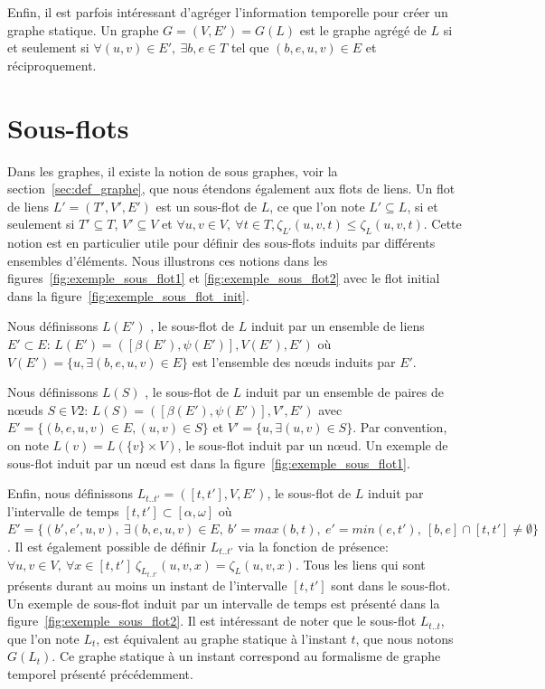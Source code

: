 Enfin, il est parfois intéressant d'agréger l'information temporelle pour créer un graphe statique.
Un graphe $G=(V,E')=G(L)$ est le graphe agrégé de $L$ si et seulement si $\forall (u,v) \in E',\ \exists b,e \in T$ tel que $(b,e,u,v) \in E$ et réciproquement.




\section{Sous-flots}
Dans les graphes, il existe la notion de sous graphes, voir la section~\ref{sec:def_graphe}, que nous étendons également aux flots de liens.
Un flot de liens $L'=(T',V',E')$ est un sous-flot de $L$, ce que l'on note $L' \subseteq L$, si et seulement si $T'\subseteq T$, $V'\subseteq V$ et $\forall u,v \in V,\ \forall t\in T, \zeta_{L'}(u,v,t) \leq \zeta_{L}(u,v,t)$.
Cette notion est en particulier utile pour définir des sous-flots induits par différents ensembles d'éléments.
Nous illustrons ces notions dans les figures~\ref{fig:exemple_sous_flot1} et \ref{fig:exemple_sous_flot2} avec le flot initial dans la figure~\ref{fig:exemple_sous_flot_init}.
 
Nous définissons $L(E')$ , le sous-flot de $L$ induit par un ensemble de liens $E' \subset E$: $L(E')=([\beta(E'),\psi(E')],V(E'),E')$ où $V(E')=\{u, \exists (b,e,u,v) \in E\}$ est l'ensemble des n\oe{}uds induits par $E'$.

 
Nous définissons $L(S)$ , le sous-flot de $L$ induit par un ensemble de paires de n\oe{}uds $S \in V2$: $L(S)=([\beta(E'),\psi(E')],V',E')$ avec $E'= \{(b,e,u,v) \in E, (u,v) \in S\}$ et $V'=\{u, \exists (u,v) \in S\}$.
Par convention, on note $L(v)= L(\{v\}\times V)$, le sous-flot induit par un n\oe{}ud.
Un exemple de sous-flot induit par un n\oe{}ud est dans la figure~\ref{fig:exemple_sous_flot1}.


Enfin, nous définissons $L_{t..t'}=([t, t'], V,E')$, le sous-flot de $L$ induit par l'intervalle de temps $[t,t'] \subset [\alpha, \omega]$ où $E'= \{(b',e',u,v),\ \exists (b,e,u,v) \in E,\ b'= max(b,t),\ e'=min(e,t'),\ [b,e]\cap [t,t']\neq \emptyset\}$.
Il est également possible de définir $L_{t..t'}$ via la fonction de présence: $\forall u,v \in V,\ \forall x \in [t,t']\  \zeta_{L_{t..t'}}(u,v,x) = \zeta_{L}(u,v,x)$.
Tous les liens qui sont présents durant au moins un instant de l'intervalle $[t, t']$ sont dans le sous-flot.
Un exemple de sous-flot induit par un intervalle de temps est présenté dans la figure~\ref{fig:exemple_sous_flot2}.
Il est intéressant de noter que le sous-flot $L_{t..t}$, que l'on note $L_t$, est équivalent au graphe statique à l'instant $t$, que nous notons $G(L_t)$.
Ce graphe statique à un instant correspond au formalisme de graphe temporel présenté précédemment.



